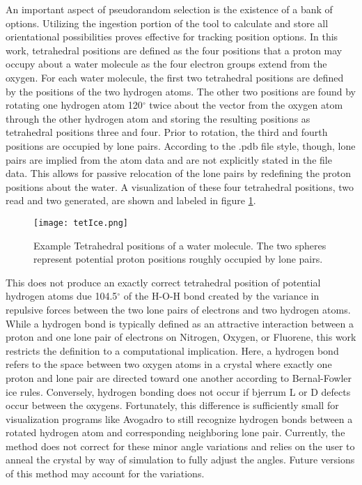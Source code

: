 An important aspect of pseudorandom selection is the existence of a bank of options.
Utilizing the ingestion portion of the tool to calculate and store all orientational possibilities proves effective for tracking position options.
In this work, tetrahedral positions are defined as the four positions that a proton may occupy about a water molecule as the four electron groups extend from the oxygen.
For each water molecule, the first two tetrahedral positions are defined by the positions of the two hydrogen atoms. 
The other two positions are found by rotating one hydrogen atom 120$^{\circ}$ twice about the vector from the oxygen atom through the other hydrogen atom and storing the resulting positions as tetrahedral positions three and four. 
Prior to rotation, the third and fourth positions are occupied by lone pairs.
According to the .pdb file style, though, lone pairs are implied from the atom data and are not explicitly stated in the file data.
This allows for passive relocation of the lone pairs by redefining the proton positions about the water.
A visualization of these four tetrahedral positions, two read and two generated, are shown and labeled in figure \ref{fig:tetXI}.

\begin{figure}
	
	\centering
	
	\texttt{[image: tetIce.png]}
	
	\caption{Example Tetrahedral positions of a water molecule. The two spheres represent potential proton positions roughly occupied by lone pairs.}
	
	\label{fig:tetXI}
	
\end{figure}

This does not produce an exactly correct tetrahedral position of potential hydrogen atoms due 104.5$^{\circ}$ of the H-O-H bond created by the variance in repulsive forces between the two lone pairs of electrons and two hydrogen atoms. 
While a hydrogen bond is typically defined as an attractive interaction between a proton and one lone pair of electrons on Nitrogen, Oxygen, or Fluorene, this work restricts the definition to a computational implication.
Here, a hydrogen bond refers to the space between two oxygen atoms in a crystal where exactly one proton and lone pair are directed toward one another according to Bernal-Fowler ice rules. 
Conversely, hydrogen bonding does not occur if bjerrum L or D defects occur between the oxygens.
Fortunately, this difference is sufficiently small for visualization programs like Avogadro to still recognize hydrogen bonds between a rotated hydrogen atom and corresponding neighboring lone pair. 
Currently, the method does not correct for these minor angle variations and relies on the user to anneal the crystal by way of simulation to fully adjust the angles. 
Future versions of this method may account for the variations.

